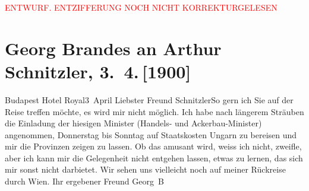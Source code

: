 
\begin{center}
            \textcolor{red}{ENTWURF. ENTZIFFERUNG NOCH NICHT KORREKTURGELESEN}
                      \end{center}
            
               \section[Georg Brandes an Arthur Schnitzler, 3. 4. {[}1900{]}]{ Georg Brandes an Arthur Schnitzler, 3. 4. {[}1900{]}}\nopagebreak{}\rehead{ }\begin{ledgroupsized}[t]{13cm}\normalsize\beginnumbering{} \toendnotes[C]{\smallbreak\pagebreak[2]} 
\toendnotes[C]{\smallbreak}\pstart
           \raggedleft{}{\pb}Budapest Hotel Royal3 April\pend
           \pstart
           Liebster Freund Schnitzler\hspace*{2.5em}So gern ich Sie auf der Reise treffen möchte,
                    es wird mir nicht möglich. Ich habe nach längerem Sträuben die Einladung der
                    hiesigen Minister (Handels- und Ackerbau-Minister) angenommen, Donnerstag bis Sonntag auf Staatskosten
                        Ungarn zu bereisen und mir die
                    Provinzen zeigen zu lassen. Ob das amusant wird, weiss ich nicht, zweifle, aber
                    ich kann mir die Gelegenheit nicht entgehen 
                    lassen, etwas zu lernen, das sich mir sonst nicht darbietet.\pend
           \pstart
           Wir sehen uns vielleicht noch auf meiner Rückreise durch Wien.\pend
           \pstart Ihr ergebener Freund \spacefill\mbox{Georg B}\pend{}\endnumbering{}\end{ledgroupsized}  \newcommand{\dateiname}{L01029}\newcommand{\titel}{Georg Brandes an Arthur Schnitzler, 3. 4. [1900]}\newcommand{\editorInnen}{Martin Anton Müller und Gerd-Hermann Susen}
      